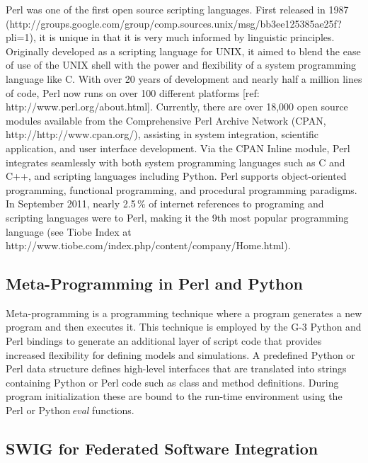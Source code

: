 \documentclass[10pt]{article}
\begin{document}
Perl was one of the first open source scripting languages. First
released in 1987
(http://groups.google.com/group/comp.sources.unix/msg/bb3ee125385ae25f?pli=1),
it is unique in that it is very much informed by linguistic
principles.  Originally developed as a scripting language for UNIX, it
aimed to blend the ease of use of the UNIX shell with the power and
flexibility of a system programming language like C.  With over 20
years of development and nearly half a million lines of code, Perl now
runs on over 100 different platforms [ref:
http://www.perl.org/about.html].  Currently, there are over 18,000
open source modules available from the Comprehensive Perl Archive
Network (CPAN, http://http://www.cpan.org/), assisting in system integration, scientific
application, and user interface development.  Via the CPAN Inline
module, Perl integrates seamlessly with both system programming
languages such as C and C++, and scripting languages including Python.
Perl supports object-oriented programming, functional programming, and
procedural programming paradigms. In September 2011, nearly
2.5\,\% of internet references to programing and scripting languages were to Perl, making
it the 9th most popular programming
language (see Tiobe Index at http://www.tiobe.com/index.php/content/company/Home.html).

\subsection*{Meta-Programming in Perl and Python}

Meta-programming is a programming technique where a program generates
a new program and then executes it.  This technique is employed by
the G-3 Python and Perl bindings to generate an
additional layer of script code that provides increased flexibility
for defining models and simulations.  A predefined Python  or
Perl data structure defines high-level interfaces that are translated
into strings containing Python or Perl code such as class and method
definitions.  During program initialization these are bound to the run-time
environment using the Perl or Python\,{\it eval} functions.

\subsection*{SWIG for Federated Software Integration}
\end{document}
